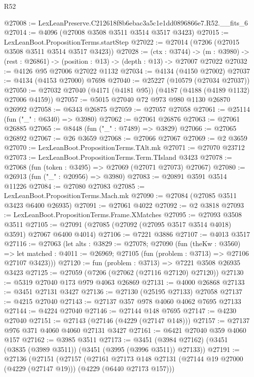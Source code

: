 \begin{lexlean}{R52}
\begin{coremodule}
@27008 := LexLeanPreserve.C212618f8b6ebac3a5c1e1dd0896866e7.R52.__fits_6
@27014 := @4096 (@27008 @3508 @3511 @3514 @3517 @3423)
@27015 := LexLeanBoot.PropositionTerms.startStep
@27022 := @27014 (@7206 (@27015 @3508 @3511 @3514 @3517 @3423))
@27028 := (ctx : @3744) ->
  (m : @3980) -> (rest : @26861) -> (position : @13) -> (depth : @13) -> @27007 @27022
@27032 := @4126 @95 @27006 @27022 @1132
@27034 := @4134 (@4150 @27002)
@27037 := @4134 (@4153 @27000) @7698
@27040 := @25227 (@10579 (@27034 @27037))
@27050 := @27032 @27040 (@4171 (@4181 @95)) (@4187 (@4188 (@4189 @1132) @27006 @4159))
@27057 := @5015 @27040 @72 @973 @980 @1130 @26870 @26992
@27058 := @6343 @26875
@27059 := @27057 @27058
@27061 := @25114 (fun ("_" : @6340) => @3980)
@27062 := @27061 @26876
@27063 := @27061 @26885
@27065 := @8448 (fun ("_" : @7489) => @3829)
@27066 := @27065 @26892
@27067 := @26 @3659
@27068 := @27066 @27067
@27069 := @2 @3659
@27070 := LexLeanBoot.PropositionTerms.TAlt.mk
@27071 := @27070 @23712
@27073 := LexLeanBoot.PropositionTerms.Term.TIsland @3423
@27078 := @27068 (fun (token : @3495) => @27069 (@27071 @27073) @27067)
@27080 := @26913 (fun ("_" : @20956) => @3980)
@27083 := @20891 @3591 @3514 @11226
@27084 := @27080 @27083
@27085 := LexLeanBoot.PropositionTerms.Mach.mk
@27090 := @27084 (@27085 @3511 @3423 @6400 @26935)
@27091 := @27061 @4022
@27092 := @2 @3818
@27093 := LexLeanBoot.PropositionTerms.Frame.XMatches
@27095 := @27093 @3508 @3511
@27105 := @27091 (@27085 (@27092 (@27095 @3517 @3514 @4018) @3591) @27067 @6400 @4014)
@27106 := @7221 @3886
@27107 := @4013 @3517
@27116 := @27063
    (let alts : @3829 := @27078;
    @27090
      (fun (theKw : @3560) =>
      let matched : @4011 := @26969; @27105 (fun (problem : @3713) => @27106 @27107 @3423)))
@27120 := fun (problem : @3713) => @7221 @3508 @26935 @3423
@27125 := @27059 (@7206 (@27062 (@27116 @27120) @27120))
@27130 := @5319 @27040 @173 @979 @4063 @26869
@27131 := @4000 @26868
@27133 := @3451 @27131 @3427
@27136 := @27130 (@25195 @27133) @27058
@27137 := @4215 @27040
@27143 := @27137 @357 @978 @4060 @4062 @7695 @27133
@27144 := @4224 @27040
@27146 := @27144 @148 @7695
@27147 := @4230 @27040
@27151 := @27143 (@27146 (@4229 (@27147 @148)))
@27157 := @27137 @976 @371 @4060 @4060 @27131 @3427
@27161 := @6421 @27040 @359 @4060 @157
@27162 := @3985 @3511
@27173 := @3451 (@3984 @27162) (@3451 (@3835 (@3989 @3511)) (@3451 (@3995 (@3996 @3511)) @27133))
@27191 := @27136
    (@27151
      (@27157
        (@27161
          @27173
          @148
          @27131
          (@27144 @19 @27000 (@4229 (@27147 @19)))
          (@4229 (@6440 @27173 @157)))

\end{coremodule}
\end{lexlean}
